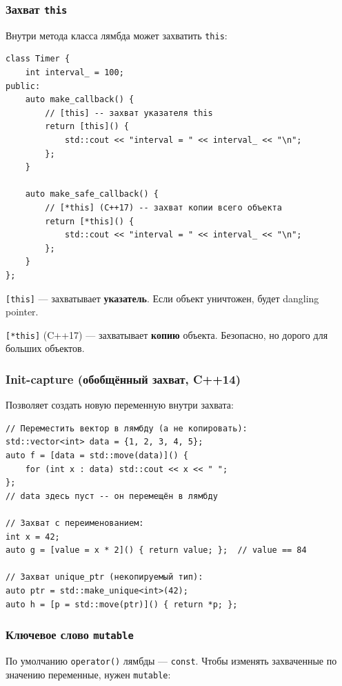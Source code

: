 \documentclass[a4paper,12pt]{article}
\begin{document}
\subsubsection{Захват \texttt{this}}

Внутри метода класса лямбда может захватить \texttt{this}:

\begin{lstlisting}
class Timer {
    int interval_ = 100;
public:
    auto make_callback() {
        // [this] -- захват указателя this
        return [this]() {
            std::cout << "interval = " << interval_ << "\n";
        };
    }

    auto make_safe_callback() {
        // [*this] (C++17) -- захват копии всего объекта
        return [*this]() {
            std::cout << "interval = " << interval_ << "\n";
        };
    }
};
\end{lstlisting}

\texttt{[this]} --- захватывает \textbf{указатель}. Если объект уничтожен, будет
dangling pointer.

\texttt{[*this]} (C++17) --- захватывает \textbf{копию} объекта. Безопасно,
но дорого для больших объектов.

\subsubsection{Init-capture (обобщённый захват, C++14)}

Позволяет создать новую переменную внутри захвата:

\begin{lstlisting}
// Переместить вектор в лямбду (а не копировать):
std::vector<int> data = {1, 2, 3, 4, 5};
auto f = [data = std::move(data)]() {
    for (int x : data) std::cout << x << " ";
};
// data здесь пуст -- он перемещён в лямбду

// Захват с переименованием:
int x = 42;
auto g = [value = x * 2]() { return value; };  // value == 84

// Захват unique_ptr (некопируемый тип):
auto ptr = std::make_unique<int>(42);
auto h = [p = std::move(ptr)]() { return *p; };
\end{lstlisting}

\subsubsection{Ключевое слово \texttt{mutable}}

По умолчанию \texttt{operator()} лямбды --- \texttt{const}. Чтобы изменять
захваченные по значению переменные, нужен \texttt{mutable}:
\end{document}
